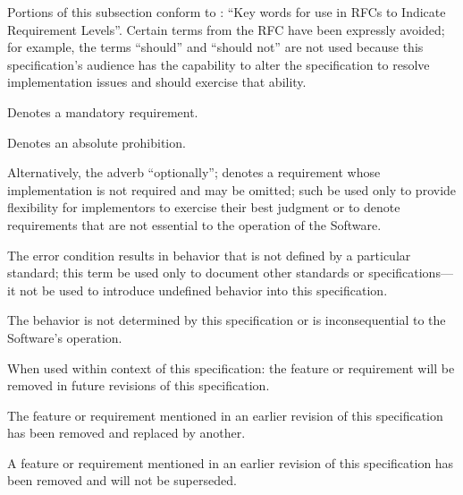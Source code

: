 %

Portions of this subsection conform to : ``Key words for use in RFCs
to Indicate Requirement Levels''. Certain terms from the RFC have been expressly
avoided; for example, the terms ``should'' and ``should not'' are not used
because this specification's audience has the capability to alter the
specification to resolve implementation issues and should exercise that ability.

\begin{description}
  Denotes a mandatory requirement.

  Denotes an absolute prohibition.

  Alternatively, the adverb ``optionally''; denotes a requirement whose
  implementation is not required and may be omitted; such \shall be used only to
  provide flexibility for implementors to exercise their best judgment or to
  denote requirements that are not essential to the operation of the Software.

  The error condition results in behavior that is not defined by a particular
  standard; this term \shall be used only to document other standards or
  specifications---it \shall not be used to introduce undefined behavior into
  this specification.

  The behavior is not determined by this specification or is inconsequential to
  the Software's operation.

  When used within context of this specification: the feature or requirement
  will be removed in future revisions of this specification.

  The feature or requirement mentioned in an earlier revision of this
  specification has been removed and replaced by another.

  A feature or requirement mentioned in an earlier revision of this
  specification has been removed and will not be superseded.
\end{description}
